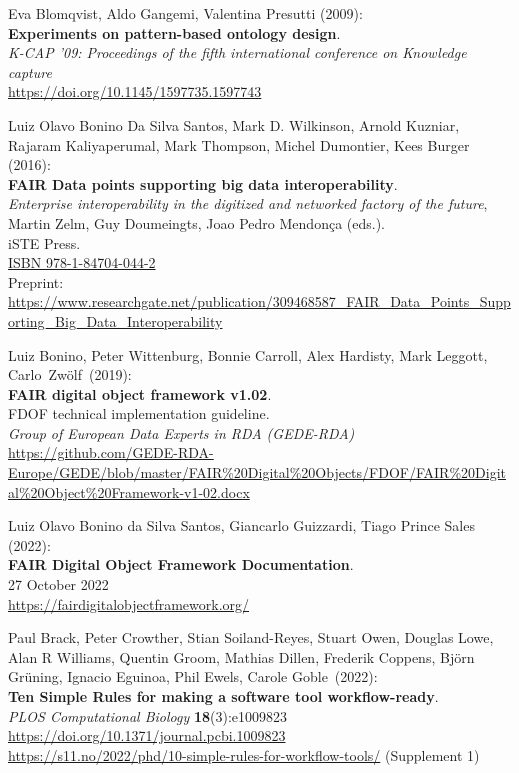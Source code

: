 \begin{thebibliography}{9}
Eva Blomqvist, Aldo Gangemi, Valentina Presutti (2009):\\
\textbf{Experiments on pattern-based ontology design}.\\
\emph{K-CAP '09: Proceedings of the fifth international conference on Knowledge capture}\\
\url{https://doi.org/10.1145/1597735.1597743}

Luiz Olavo Bonino Da Silva Santos, Mark D. Wilkinson, Arnold Kuzniar,
Rajaram Kaliyaperumal, Mark Thompson, Michel Dumontier, Kees Burger
(2016):\\
\textbf{FAIR Data points supporting big data interoperability}. \\
\emph{Enterprise interoperability in the digitized and networked factory of the future}, Martin Zelm, Guy Doumeingts, Joao Pedro Mendonça (eds.).\\
iSTE Press. \\
\href{http://www.iste.co.uk/book.php?id=1073}{ISBN 978-1-84704-044-2} \\
Preprint: \url{https://www.researchgate.net/publication/309468587_FAIR_Data_Points_Supporting_Big_Data_Interoperability}

Luiz Bonino, Peter Wittenburg, Bonnie Carroll, Alex
Hardisty, Mark Leggott, Carlo~Zwölf~(2019):\\
\textbf{FAIR digital object framework v1.02}.\\
FDOF technical implementation guideline.\\
\emph{Group of European Data Experts in RDA (GEDE-RDA)}\\
\url{https://github.com/GEDE-RDA-Europe/GEDE/blob/master/FAIR\%20Digital\%20Objects/FDOF/FAIR\%20Digital\%20Object\%20Framework-v1-02.docx}

Luiz Olavo Bonino da Silva Santos, Giancarlo Guizzardi, Tiago Prince Sales (2022): \\
\textbf{FAIR Digital Object Framework Documentation}. \\
27 October 2022\\
\url{https://fairdigitalobjectframework.org/}

Paul Brack, Peter Crowther, Stian Soiland-Reyes, Stuart Owen,
Douglas Lowe, Alan R Williams, Quentin Groom, Mathias Dillen, Frederik
Coppens, Björn Grüning, Ignacio Eguinoa, Phil Ewels, Carole Goble~(2022):\\
\textbf{Ten Simple Rules for making a software tool workflow-ready}.\\
\emph{PLOS Computational Biology} \textbf{18}(3):e1009823\\
\url{https://doi.org/10.1371/journal.pcbi.1009823}\\
\url{https://s11.no/2022/phd/10-simple-rules-for-workflow-tools/}
(Supplement 1)


\end{thebibliography}
